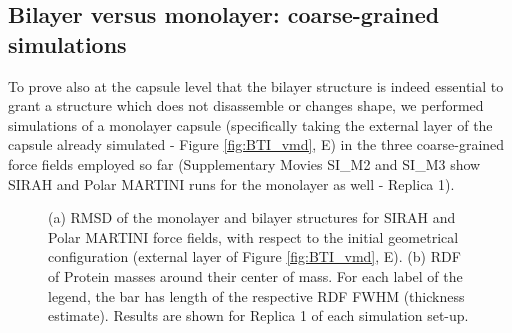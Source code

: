 \subsection{Bilayer versus monolayer: coarse-grained simulations} \label{sec:mono}
To prove also at the capsule level that the bilayer structure is indeed essential to grant a structure which does not disassemble or changes shape, we performed simulations of a monolayer capsule (specifically taking the external layer of the capsule already simulated - Figure \ref{fig:BTI_vmd}, E) in the three coarse-grained force fields employed so far (Supplementary Movies SI\_M2 and SI\_M3 show SIRAH and Polar MARTINI runs for the monolayer as well - Replica 1).
%
\begin{figure}[h!]
    \caption[Comparison of monolayer and bilayer structural properties]{(a) RMSD of the monolayer and bilayer structures for SIRAH and Polar MARTINI force fields, with respect to the initial geometrical configuration (external layer of Figure \ref{fig:BTI_vmd}, E). (b) RDF of Protein masses around their center of mass. For each label of the legend, the bar has length of the respective RDF FWHM (thickness estimate). Results are shown for Replica 1 of each simulation set-up.}
\label{fig:mono_bi}
\end{figure}

